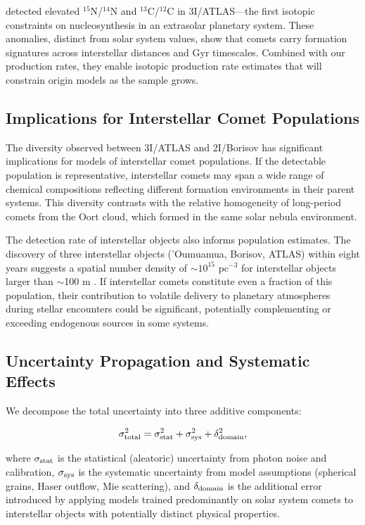 \documentclass[preprint2]{aastex631}
\begin{document}
\citet{opitom26} detected elevated $^{15}$N/$^{14}$N and $^{13}$C/$^{12}$C in 3I/ATLAS---the first isotopic constraints on nucleosynthesis in an extrasolar planetary system. These anomalies, distinct from solar system values, show that comets carry formation signatures across interstellar distances and Gyr timescales. Combined with our production rates, they enable isotopic production rate estimates that will constrain origin models as the sample grows.

\subsection{Implications for Interstellar Comet Populations}

The diversity observed between 3I/ATLAS and 2I/Borisov has significant implications for models of interstellar comet populations. If the detectable population is representative, interstellar comets may span a wide range of chemical compositions reflecting different formation environments in their parent systems. This diversity contrasts with the relative homogeneity of long-period comets from the Oort cloud, which formed in the same solar nebula environment.

The detection rate of interstellar objects also informs population estimates. The discovery of three interstellar objects ('Oumuamua, Borisov, ATLAS) within eight years suggests a spatial number density of $\sim 10^{15}$ pc$^{-3}$ for interstellar objects larger than $\sim$100 m \citep{jewitt22}. If interstellar comets constitute even a fraction of this population, their contribution to volatile delivery to planetary atmospheres during stellar encounters could be significant, potentially complementing or exceeding endogenous sources in some systems.

\subsection{Uncertainty Propagation and Systematic Effects}

We decompose the total uncertainty into three additive components:

\begin{equation}
\sigma_{\rm total}^2 = \sigma_{\rm stat}^2 + \sigma_{\rm sys}^2 + \delta_{\rm domain}^2,
\end{equation}

where $\sigma_{\rm stat}$ is the statistical (aleatoric) uncertainty from photon noise and calibration, $\sigma_{\rm sys}$ is the systematic uncertainty from model assumptions (spherical grains, Haser outflow, Mie scattering), and $\delta_{\rm domain}$ is the additional error introduced by applying models trained predominantly on solar system comets to interstellar objects with potentially distinct physical properties.
\end{document}
